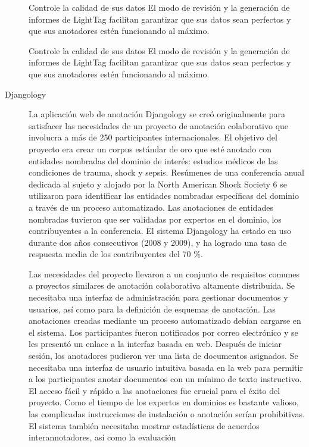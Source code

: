 \begin{description}
Controle la calidad de sus datos
El modo de revisión y la generación de informes de LightTag facilitan garantizar que sus datos sean perfectos y que sus anotadores estén funcionando al máximo.

Controle la calidad de sus datos
El modo de revisión y la generación de informes de LightTag facilitan garantizar que sus datos sean perfectos y que sus anotadores estén funcionando al máximo.

\item[Djangology]

La aplicación web de anotación Djangology se creó originalmente para satisfacer las necesidades de un proyecto de anotación colaborativo que involucra a más de 250 participantes internacionales. El objetivo del proyecto era crear un corpus estándar de oro que esté anotado con entidades nombradas del dominio de interés: estudios médicos de las condiciones de trauma, shock y sepsis. Resúmenes de una conferencia anual dedicada
al sujeto y alojado por la North American Shock Society 6 se utilizaron para identificar las entidades nombradas específicas del dominio a través de un proceso automatizado. Las anotaciones de entidades nombradas tuvieron que ser validadas por expertos en el dominio, los contribuyentes a la conferencia. El sistema Djangology
ha estado en uso durante dos años consecutivos (2008 y 2009), y ha logrado una tasa de respuesta media de los contribuyentes del 70 \%.

Las necesidades del proyecto llevaron a un conjunto de requisitos comunes a proyectos similares de anotación colaborativa altamente distribuida. Se necesitaba una interfaz de administración para gestionar documentos y usuarios, así como para la definición de esquemas de anotación. Las anotaciones creadas mediante un proceso automatizado debían cargarse en el sistema. Los participantes fueron notificados por correo electrónico y se les presentó un enlace a la interfaz basada en web. Después de iniciar sesión, los anotadores pudieron ver una lista de documentos asignados. Se necesitaba una interfaz de usuario intuitiva basada en la web para permitir a los participantes anotar documentos con un mínimo de texto instructivo. El acceso fácil y rápido a las anotaciones fue crucial para el éxito del proyecto. Como el tiempo de los expertos en dominios es bastante valioso, las complicadas instrucciones de instalación o anotación serían prohibitivas. El sistema también necesitaba mostrar estadísticas de acuerdos interannotadores, así como la evaluación


\end{description}
